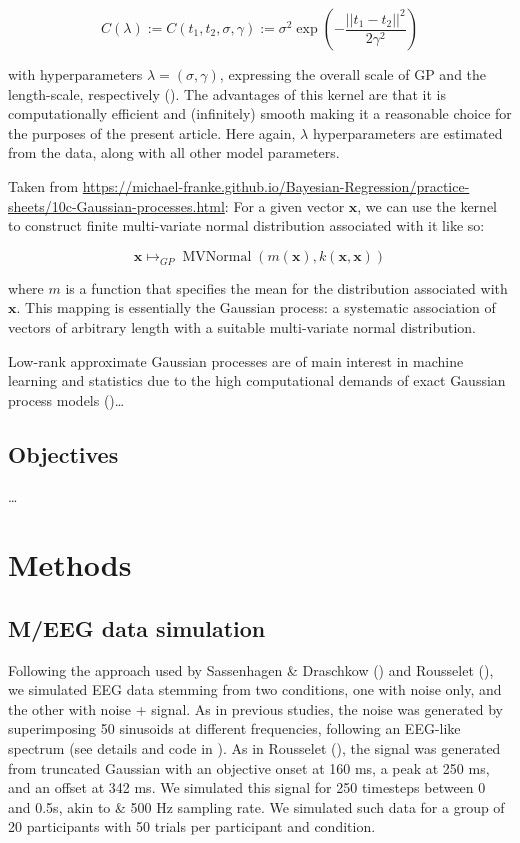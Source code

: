 \documentclass[
  doc,
  floatsintext,
  longtable,
  a4paper,
  nolmodern,
  notxfonts,
  notimes,
  colorlinks=true,linkcolor=blue,citecolor=blue,urlcolor=blue]{apa7}
\begin{document}
\[
C(\lambda) := C\left(t_1, t_2, \sigma, \gamma\right) := \sigma^2 \exp \left(-\frac{||t_1-t_2||^{2}}{2 \gamma^2}\right)
\]

with hyperparameters \(\lambda = (\sigma, \gamma)\), expressing the
overall scale of GP and the length-scale, respectively
(). The
advantages of this kernel are that it is computationally efficient and
(infinitely) smooth making it a reasonable choice for the purposes of
the present article. Here again, \(\lambda\) hyperparameters are
estimated from the data, along with all other model parameters.

Taken from
\url{https://michael-franke.github.io/Bayesian-Regression/practice-sheets/10c-Gaussian-processes.html}:
For a given vector \(\mathbf{x}\), we can use the kernel to construct
finite multi-variate normal distribution associated with it like so:

\[
\mathbf{x} \mapsto_{G P} \operatorname{MVNormal}(m(\mathbf{x}), k(\mathbf{x}, \mathbf{x}))
\]

where \(m\) is a function that specifies the mean for the distribution
associated with \(\mathbf{x}\). This mapping is essentially the Gaussian
process: a systematic association of vectors of arbitrary length with a
suitable multi-variate normal distribution.

Low-rank approximate Gaussian processes are of main interest in machine
learning and statistics due to the high computational demands of exact
Gaussian process models
()\ldots{}

\subsection{Objectives}\label{objectives}

\ldots{}

\section{Methods}\label{methods}

\subsection{M/EEG data simulation}\label{meeg-data-simulation}

Following the approach used by Sassenhagen \& Draschkow
() and Rousselet
(), we simulated EEG data
stemming from two conditions, one with noise only, and the other with
noise + signal. As in previous studies, the noise was generated by
superimposing 50 sinusoids at different frequencies, following an
EEG-like spectrum (see details and code in
). As in Rousselet
(), the signal was generated
from truncated Gaussian with an objective onset at 160 ms, a peak at 250
ms, and an offset at 342 ms. We simulated this signal for 250 timesteps
between 0 and 0.5s, akin to \& 500 Hz sampling rate. We simulated such
data for a group of 20 participants with 50 trials per participant and
condition.
\end{document}
